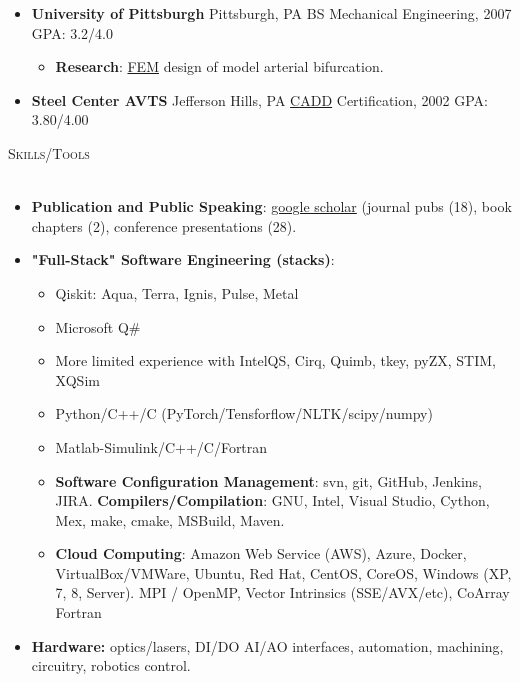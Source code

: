 \documentclass{article}
\newcommand{\lineunder}{\vspace*{-8pt} \\ \hspace*{-18pt} \hrulefill \\}
\newcommand{\header}[1]{{\hspace*{-15pt}\vspace*{6pt} \textsc{#1}} \vspace*{-6pt} \lineunder}
\newenvironment{achievements}{\begin{list}{$\bullet$}{\topsep 0pt \itemsep -2pt}}{\vspace*{4pt}\end{list}}
\begin{document}
\begin{itemize}[leftmargin=*]
  \item \textbf{University of Pittsburgh} Pittsburgh, PA BS Mechanical Engineering, 2007 GPA: 3.2/4.0
  \begin{itemize}
    \item \textbf{Research}: \href{http://en.wikipedia.org/wiki/Finite_element_method}{FEM} design of model arterial bifurcation.
  \end{itemize}

  \item \textbf{Steel Center AVTS} Jefferson Hills, PA \href{http://en.wikipedia.org/wiki/Computer-aided_design}{CADD} Certification, 2002 GPA: 3.80/4.00

\end{itemize}

\header{\Large{Skills/Tools}}


\begin{itemize}[leftmargin=*]

  \item \textbf{Publication and Public Speaking}: \href{https://scholar.google.com/citations?hl=en&user=ry2klw0AAAAJ}{google scholar} (journal pubs (18), book chapters (2), conference presentations (28).

  \item \textbf{"Full-Stack" Software Engineering (stacks)}: 
  \begin{itemize}
    \item Qiskit: Aqua, Terra, Ignis, Pulse, Metal
    \item Microsoft Q#
    \item More limited experience with IntelQS, Cirq, Quimb, tkey, pyZX, STIM, XQSim
    \item Python/C++/C (PyTorch/Tensforflow/NLTK/scipy/numpy)
    \item Matlab-Simulink/C++/C/Fortran    
    \item \textbf{Software Configuration Management}: svn, git, GitHub, Jenkins, JIRA.  \textbf{Compilers/Compilation}: GNU, Intel, Visual Studio, Cython, Mex, make, cmake, MSBuild, Maven. 
    \item \textbf{Cloud Computing}: Amazon Web Service (AWS),  Azure, Docker, VirtualBox/VMWare, Ubuntu, Red Hat, CentOS, CoreOS, Windows (XP, 7, 8, Server). MPI / OpenMP, Vector Intrinsics (SSE/AVX/etc), CoArray Fortran
  \end{itemize}

  \item \textbf{Hardware:} optics/lasers, DI/DO AI/AO interfaces, automation, machining, circuitry,  robotics control.
 
\end{itemize}
\end{document}
